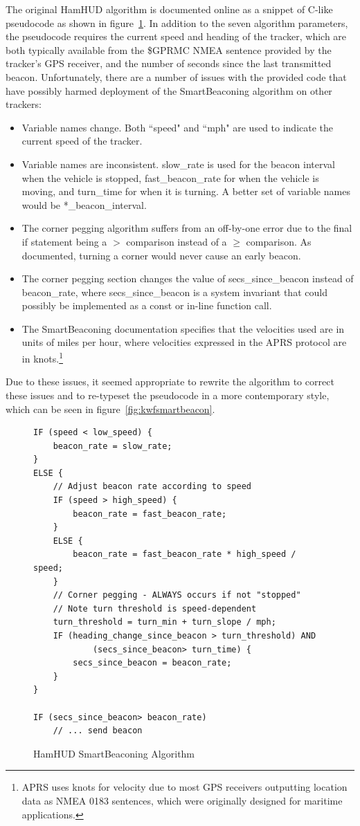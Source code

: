 The original HamHUD algorithm is documented online as a snippet of C-like 
pseudocode as shown in figure~\ref{fig:hamhudsmartbeacon}.
In addition to the seven algorithm parameters, the pseudocode
requires the current speed and heading of the tracker, which are both
typically available from the \$GPRMC NMEA sentence \cite{nmearmc} provided by the 
tracker's GPS receiver, and the number of seconds since the last transmitted beacon.
Unfortunately, there are a number of issues with the provided code that
have possibly harmed deployment of the SmartBeaconing algorithm on other trackers:
\begin{itemize}
	\item Variable names change. Both ``speed" and ``mph" are used 
		to indicate the current speed of the tracker.
	\item Variable names are inconsistent. 
		slow\_rate is used for the beacon interval when the vehicle is stopped, 
		fast\_beacon\_rate for when the vehicle is moving,
		and turn\_time for when it is turning.
		A better set of variable names would be *\_beacon\_interval.
	\item The corner pegging algorithm suffers from an off-by-one error due to
		the final if statement being a $>$ comparison instead
		of a $\geq$ comparison. As documented, turning a corner would
		never cause an early beacon.
	\item The corner pegging section changes the value of secs\_since\_beacon
		instead of beacon\_rate, where secs\_since\_beacon is a system
		invariant that could possibly be implemented as a const
		or in-line function call.
	\item The SmartBeaconing documentation specifies that 
		the velocities used are in units
		of miles per hour, where velocities expressed in the APRS
		protocol are in knots.\footnote{APRS uses knots for velocity
			due to most GPS receivers outputting location
			data as NMEA 0183 sentences, which were originally designed 
			for maritime applications.}
\end{itemize}

Due to these issues, it seemed appropriate to rewrite the algorithm 
to correct these issues and to re-typeset the pseudocode in a more
contemporary style, which can be seen in figure~\ref{fig:kwfsmartbeacon}.

\begin{figure}[p]
\begin{lstlisting}
IF (speed < low_speed) {
	beacon_rate = slow_rate;
}
ELSE {
	// Adjust beacon rate according to speed
	IF (speed > high_speed) {
		beacon_rate = fast_beacon_rate;
	}
	ELSE {
		beacon_rate = fast_beacon_rate * high_speed / speed;
	}
	// Corner pegging - ALWAYS occurs if not "stopped"
	// Note turn threshold is speed-dependent
	turn_threshold = turn_min + turn_slope / mph;
	IF (heading_change_since_beacon > turn_threshold) AND
			(secs_since_beacon> turn_time) {
		secs_since_beacon = beacon_rate;
	}
}

IF (secs_since_beacon> beacon_rate)
	// ... send beacon
\end{lstlisting}
\caption{HamHUD SmartBeaconing Algorithm}
\label{fig:hamhudsmartbeacon}
\end{figure}

